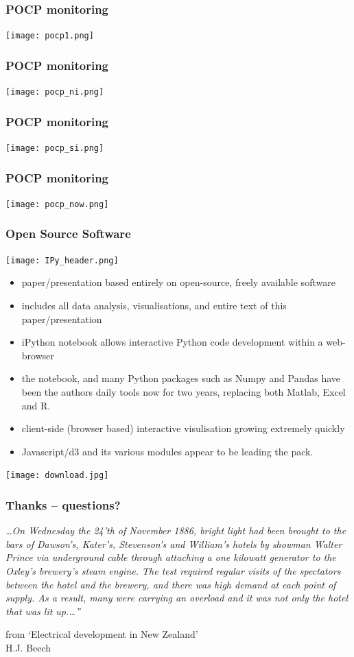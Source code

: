 \documentclass[aspectratio=169]{beamer}
\begin{document}
\frame
{\frametitle{POCP monitoring}
\begin{center}
\texttt{[image: pocp1.png]} 
\end{center}
}

\frame
{\frametitle{POCP monitoring}
\begin{center}
\texttt{[image: pocp\_ni.png]} 
\end{center}
}

\frame
{\frametitle{POCP monitoring}
\begin{center}
\texttt{[image: pocp\_si.png]} 
\end{center}
}

\frame
{\frametitle{POCP monitoring}
\begin{center}
\texttt{[image: pocp\_now.png]} 
\end{center}
}

\frame
{\frametitle{Open Source Software}

\begin{flushright}
\texttt{[image: IPy\_header.png]} 
\end{flushright}
\vspace{-5mm}
\begin{itemize}
   \item paper/presentation based entirely on open-source, freely available software
   \item includes all data analysis, visualisations, and entire text of this paper/presentation
   \item iPython notebook allows interactive Python code development within a web-browser
   \item the notebook, and many Python packages such as Numpy and Pandas have been the authors daily tools now for two years, replacing both Matlab, Excel and R.
   \item client-side (browser based) interactive visulisation growing extremely quickly
   \item Javascript/d3 and its various modules appear to be leading the pack.
\end{itemize}
\texttt{[image: download.jpg]} 

}

\frame
{\frametitle{Thanks -- questions?}

\emph{\ldots On Wednesday the 24'th of November 1886, bright light had been brought to the bars of Dawson's, Kater's, Stevenson's and William's hotels by showman Walter Prince via underground cable through attaching a one kilowatt generator to the Oxley's brewery's steam engine. The test required regular visits of the spectators between the hotel and the brewery, and there was high demand at each point of supply. As a result, many were carrying an overload and it was not only the hotel that was lit up.\ldots''}
\begin{flushright}
\scriptsize from `Electrical development in New Zealand' \\
H.J. Beech
\end{flushright}
}
\end{document}
